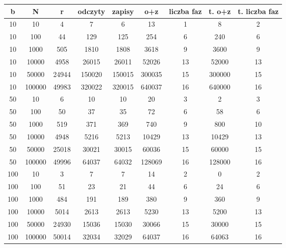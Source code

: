 \documentclass{article}
\begin{document}
\begin{center}
\begin{tabular}{ c | c c | c c c c | c c}
 b  & N         & r & odczyty       & zapisy         & o+z       & liczba faz & t. o+z & t. liczba faz\\ 
\hline
 10 & 10        & 4         & 7         & 6         & 13        & 1     & 8         & 2  \\  
 10 & 100       & 44        & 129       & 125       & 254       & 6     & 240       & 6  \\
 10 & 1000      & 505       & 1810      & 1808      & 3618      & 9     & 3600      & 9 \\
 10 & 10000     & 4958      & 26015     & 26011     & 52026     & 13    & 52000     & 13 \\
 10 & 50000     & 24944     & 150020    & 150015    & 300035    & 15    & 300000    & 15 \\
 10 & 100000    & 49983     & 320022    & 320015    & 640037    & 16    & 640000    & 16 \\
 \hline
 50 & 10        & 6         & 10        & 10        & 20        & 3     & 2        & 3  \\  
 50 & 100       & 50        & 37       & 35       & 72       & 6     & 58       & 6  \\
 50 & 1000      & 519       & 371      & 369      & 740      & 9     & 800      & 10 \\
 50 & 10000     & 4948      & 5216     & 5213     & 10429     & 13    & 10429     & 13 \\
 50 & 50000     & 25018     & 30021    & 30015    & 60036    & 15    & 60000    & 15 \\
 50 & 100000    & 49996     & 64037    & 64032    & 128069    & 16    & 128000    & 16 \\
  \hline
 100 & 10        & 3         & 7         & 7         & 14        & 2     & 0        & 2  \\  
 100 & 100       & 51        & 23       & 21       & 44       & 6     & 24       & 6  \\
 100 & 1000      & 484       & 191      & 189      & 380      & 9     & 360      & 9 \\
 100 & 10000     & 5014      & 2613     & 2613     & 5230     & 13    & 5200     & 13 \\
 100 & 50000     & 24930     & 15036    & 15030    & 30066    & 15    & 30000    & 15 \\
 100 & 100000    & 50014     & 32034    & 32029    & 64037    & 16    & 64063    & 16 \\
\end{tabular}


\end{center}
\end{document}
